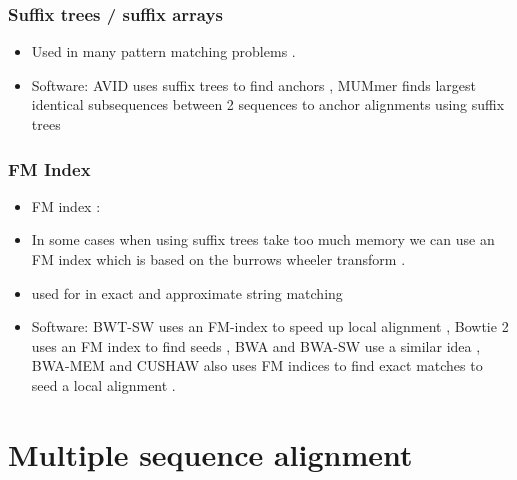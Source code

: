 \documentclass[
  11pt,
  twoside]{scrbook}
\begin{document}
\hypertarget{suffix-trees-suffix-arrays}{%
\subsubsection{Suffix trees / suffix arrays}\label{suffix-trees-suffix-arrays}}

\begin{itemize}
\item
  Used in many pattern matching problems \autocite{gusfieldAlgorithmsStringsTrees1997}.
\item
  Software: AVID uses suffix trees to find anchors \autocite{brayAVIDGlobalAlignment2003}, MUMmer finds largest identical subsequences between 2 sequences to anchor alignments using suffix trees \autocite{delcherFastAlgorithmsLargescale2002}
\end{itemize}

\hypertarget{fm-index}{%
\subsubsection{FM Index}\label{fm-index}}

\begin{itemize}
\item
  FM index \autocite{ferraginaOpportunisticDataStructures2000}:
\item
  In some cases when using suffix trees take too much memory we can use an FM index which is based on the burrows wheeler transform \autocite{burrowsBlockSortingLosslessData1994}.
\item
  used for in exact and approximate string matching \autocite{sungAlgorithmsBioinformaticsPractical2011}
\item
  Software: BWT-SW uses an FM-index to speed up local alignment \autocite{lamCompressedIndexingLocal2008}, Bowtie 2 uses an FM index to find seeds \autocite{langmeadFastGappedreadAlignment2012}, BWA and BWA-SW use a similar idea \autocite{liFastAccurateShort2009,liFastAccurateLongread2010}, BWA-MEM \autocite{liAligningSequenceReads2013} and CUSHAW \autocite{liuLongReadAlignment2012} also uses FM indices to find exact matches to seed a local alignment .
\end{itemize}

\hypertarget{multiple-sequence-alignment}{%
\section{Multiple sequence alignment}\label{multiple-sequence-alignment}}
\end{document}
